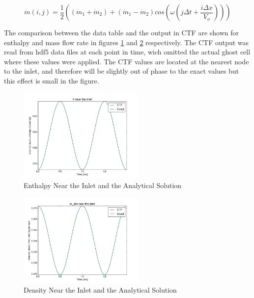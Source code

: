 \documentclass{mc2015}
\begin{document}
\begin{equation}
	\label{eq:Sine_Wave:m_dot}
	\dot{m}(i,j) = \frac{1}{2} \left( 
			(\dot{m}_{1}+\dot{m}_{2}) + (\dot{m}_{1}-\dot{m}_{2}) cos\left(
				\omega \left( j \Delta t + \frac{i \Delta x}{V_{o}} \right)
				\right)
			\right)
\end{equation}


The comparison between the data table and the output in CTF are shown for
enthalpy and mass flow rate in figures \ref{fig:Inlet_h} and
\ref{fig:Inlet_m_dot} respectively. The CTF output was read from hdf5 data files
at each point in time, wich omitted the actual ghost cell where these values
were applied. The CTF values are located at the nearest node to the inlet, and
therefore will be slightly out of phase to the exact values but this effect is
small in the figure.

\begin{figure}[!h]
	\centering
	\includegraphics[width=0.55\textwidth]{images/Code_Verification/run_00_00/residual/results/Inlet_h}
	\caption{Enthalpy Near the Inlet and the Analytical Solution}
	\label{fig:Inlet_h}
\end{figure}

\begin{figure}[!h]
	\centering
	\includegraphics[width=0.55\textwidth]{images/Code_Verification/run_00_00/residual/results/Inlet_m_dot}
	\caption{Density Near the Inlet and the Analytical Solution}
	\label{fig:Inlet_m_dot}
\end{figure}
\end{document}
